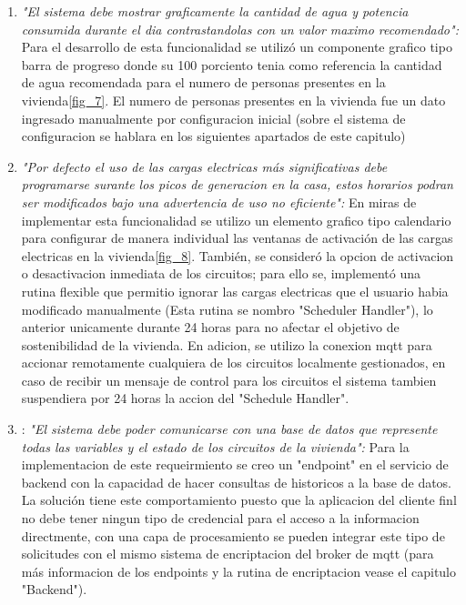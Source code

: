 \begin{enumerate}
	\item \textsl{"El sistema debe mostrar graficamente la cantidad de agua y potencia consumida durante el dia contrastandolas con un valor maximo recomendado":} Para el desarrollo de esta funcionalidad se utilizó un componente grafico tipo barra de progreso donde su 100 porciento tenia como referencia la cantidad de agua recomendada para el numero de personas presentes en la vivienda\ref{fig_7}. El numero de personas presentes en la vivienda fue un dato ingresado manualmente por configuracion inicial (sobre el sistema de configuracion se hablara en los siguientes apartados de este capitulo)
	
	\item \textsl{"Por defecto el uso de las cargas electricas más significativas debe programarse surante los picos de generacion en la casa, estos horarios podran ser modificados bajo una advertencia de uso no eficiente":} En miras de implementar esta funcionalidad se utilizo un elemento grafico tipo calendario para configurar de manera individual las ventanas de activación de las cargas electricas en la vivienda\ref{fig_8}. 
	También, se consideró la opcion de activacion o desactivacion inmediata de los circuitos; para ello se, implementó una rutina flexible que permitio ignorar las cargas electricas que el usuario habia modificado manualmente (Esta rutina se nombro "Scheduler Handler"), lo anterior unicamente durante 24 horas para no afectar el objetivo de sostenibilidad de la vivienda. 
	En adicion, se utilizo la conexion mqtt para accionar remotamente cualquiera de los circuitos localmente gestionados, en caso de recibir un mensaje de control para los circuitos el sistema tambien suspendiera por 24 horas la accion del "Schedule Handler".
	
	\item: \textsl{"El sistema debe poder comunicarse con una base de datos que represente todas las variables y el estado de los circuitos de la vivienda":} Para la implementacion de este requeirmiento se creo un "endpoint" en el servicio de backend con la capacidad de hacer consultas de historicos a la base de datos. La solución tiene este comportamiento puesto que la aplicacion del cliente finl no debe tener ningun tipo de credencial para el acceso a la informacion directmente, con una capa de procesamiento se pueden integrar este tipo de solicitudes con el mismo sistema de encriptacion del broker de mqtt (para más informacion de los endpoints y la rutina de encriptacion vease el capitulo "Backend").
\end{enumerate}


